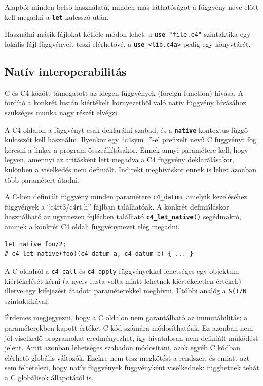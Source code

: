 Alapból minden belső használatú, minden más láthatóságot a függvény neve előtt kell megadni a {\tt\bf let} kulcsszó után.

Használni másik fájlokat kétféle módon lehet: a {\tt {\bf use} "file.c4"} szintaktika egy lokális fájl függvényeit teszi elérhetővé, 
a {\tt {\bf use} <lib.c4a>} pedig egy könyvtárét.

\subsection*{Natív interoperabilitás}

C és C4 között támogatott az idegen függvények (foreign function) hívása.
A fordító a konkrét lustán kiértékelt környezetből való natív függvény hívásához szükséges munka nagy részét elvégzi.

A C4 oldalon a függvényt csak deklarálni szabad, és a {\tt\bf native} kontextus függő kulcsszót kell használni.
Ilyenkor egy ``c4sym\_''-el prefixelt nevű C függvényt fog keresni a linker a program összeállításakor.
Ennek annyi paramétere kell, hogy legyen, amennyi az aritásként lett megadva a C4 függvény deklarálásakor, különben a viselkedés nem definiált.
Indirekt meghíváskor ennek is lehet azonban több paramétert átadni.

A C-ben definiált függvény minden paramétere {\tt c4\_datum}, amelyik kezeléséhez függvények a ``c4rt3/c4rt.h'' fájlban találhatóak.
A konkrét definiáláskor használható az ugyanezen fejlécben található {\tt {\bf c4\_let\_native}()} segédmakró, aminek a konkrét C4 oldali függvénynevet elég megadni.

\begin{lstlisting}
let native foo/2;
# c4_let_native(foo)(c4_datum a, c4_datum b) { ... }
\end{lstlisting}

A C oldalról a {\tt c4\_call} és {\tt c4\_apply} függvényekkel lehetséges egy objektum kiértékelését kérni (a nyelv lusta volta miatt lehetnek kiértékeletlen értékek) illetve egy kifejezést átadott paraméterekkel meghívni.
Utóbbi analóg a {\tt \&()/N} szintaktikával.

Érdemes megjegyezni, hogy a C oldalon nem garantálható az immutábilitás: a paraméterekben kapott értéket C kód számára módosíthatóak.
Ez azonban nem jól viselkedő programokat eredményezhet, így hivatalosan nem definiált működést jelent.
Amit azonban lehetséges szabadon módosítani, azok egyéb C kódban elérhető globális változók.
Ezekre nem tesz megkötést a rendszer, és emiatt azt sem feltételezi, hogy natív függvények függvényként viselkednek: függhetnek tehát a C globálisok állapotától is.





